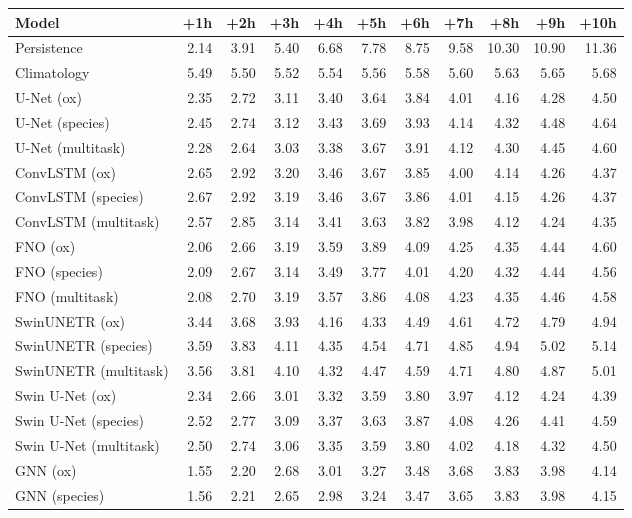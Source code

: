 \begin{table}[t]
\centering\small
\begin{tabular}{lrrrrrrrrrr}
\toprule
Model & +1h & +2h & +3h & +4h & +5h & +6h & +7h & +8h & +9h & +10h \\
\midrule
Persistence & 2.14 & 3.91 & 5.40 & 6.68 & 7.78 & 8.75 & 9.58 & 10.30 & 10.90 & 11.36 \\
Climatology & 5.49 & 5.50 & 5.52 & 5.54 & 5.56 & 5.58 & 5.60 & 5.63 & 5.65 & 5.68 \\
U-Net (ox) & 2.35 & 2.72 & 3.11 & 3.40 & 3.64 & 3.84 & 4.01 & 4.16 & 4.28 & 4.50 \\
U-Net (species) & 2.45 & 2.74 & 3.12 & 3.43 & 3.69 & 3.93 & 4.14 & 4.32 & 4.48 & 4.64 \\
U-Net (multitask) & 2.28 & 2.64 & 3.03 & 3.38 & 3.67 & 3.91 & 4.12 & 4.30 & 4.45 & 4.60 \\
ConvLSTM (ox) & 2.65 & 2.92 & 3.20 & 3.46 & 3.67 & 3.85 & 4.00 & 4.14 & 4.26 & 4.37 \\
ConvLSTM (species) & 2.67 & 2.92 & 3.19 & 3.46 & 3.67 & 3.86 & 4.01 & 4.15 & 4.26 & 4.37 \\
ConvLSTM (multitask) & 2.57 & 2.85 & 3.14 & 3.41 & 3.63 & 3.82 & 3.98 & 4.12 & 4.24 & 4.35 \\
FNO (ox) & 2.06 & 2.66 & 3.19 & 3.59 & 3.89 & 4.09 & 4.25 & 4.35 & 4.44 & 4.60 \\
FNO (species) & 2.09 & 2.67 & 3.14 & 3.49 & 3.77 & 4.01 & 4.20 & 4.32 & 4.44 & 4.56 \\
FNO (multitask) & 2.08 & 2.70 & 3.19 & 3.57 & 3.86 & 4.08 & 4.23 & 4.35 & 4.46 & 4.58 \\
SwinUNETR (ox) & 3.44 & 3.68 & 3.93 & 4.16 & 4.33 & 4.49 & 4.61 & 4.72 & 4.79 & 4.94 \\
SwinUNETR (species) & 3.59 & 3.83 & 4.11 & 4.35 & 4.54 & 4.71 & 4.85 & 4.94 & 5.02 & 5.14 \\
SwinUNETR (multitask) & 3.56 & 3.81 & 4.10 & 4.32 & 4.47 & 4.59 & 4.71 & 4.80 & 4.87 & 5.01 \\
Swin U-Net (ox) & 2.34 & 2.66 & 3.01 & 3.32 & 3.59 & 3.80 & 3.97 & 4.12 & 4.24 & 4.39 \\
Swin U-Net (species) & 2.52 & 2.77 & 3.09 & 3.37 & 3.63 & 3.87 & 4.08 & 4.26 & 4.41 & 4.59 \\
Swin U-Net (multitask) & 2.50 & 2.74 & 3.06 & 3.35 & 3.59 & 3.80 & 4.02 & 4.18 & 4.32 & 4.50 \\
GNN (ox) & 1.55 & 2.20 & 2.68 & 3.01 & 3.27 & 3.48 & 3.68 & 3.83 & 3.98 & 4.14 \\
GNN (species) & 1.56 & 2.21 & 2.65 & 2.98 & 3.24 & 3.47 & 3.65 & 3.83 & 3.98 & 4.15 \\

\end{tabular}
\end{table}
